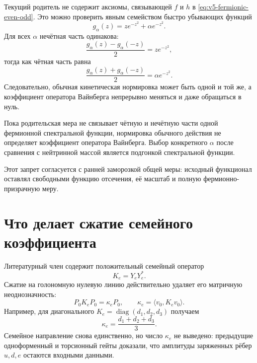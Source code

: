 Текущий родитель не содержит аксиомы, связывающей $f$ и $h$ в
\eqref{eq:v5-fermionic-even-odd}. Это можно проверить явным семейством
быстро убывающих функций
\begin{equation}
 g_\alpha(z)=z e^{-z^2}+\alpha e^{-z^2}.
 \label{eq:v5-fermionic-function-counterfamily}
\end{equation}
Для всех $\alpha$ нечётная часть одинакова:
\begin{equation}
 \frac{g_\alpha(z)-g_\alpha(-z)}2=z e^{-z^2},
\end{equation}
тогда как чётная часть равна
\begin{equation}
 \frac{g_\alpha(z)+g_\alpha(-z)}2=\alpha e^{-z^2}.
\end{equation}
Следовательно, обычная кинетическая нормировка может быть одной и той же,
а коэффициент оператора Вайнберга непрерывно меняться и даже обращаться в
нуль.

\begin{nogocriterion}
Пока родительская мера не связывает чётную и нечётную части одной
фермионной спектральной функции, нормировка обычного действия не определяет
коэффициент оператора Вайнберга. Выбор конкретного $\alpha$ после сравнения
с нейтринной массой является подгонкой спектральной функции.
\end{nogocriterion}

Этот запрет согласуется с ранней заморозкой общей меры: исходный
функционал оставлял свободными функцию отсечения, её масштаб и полную
фермионно-призрачную меру.

\section{Что делает сжатие семейного коэффициента}

Литературный член содержит положительный семейный оператор
\begin{equation}
 K_e=Y_eY_e^*.
\end{equation}
Сжатие на голономную нулевую линию действительно удаляет его матричную
неоднозначность:
\begin{equation}
 P_0K_eP_0=\kappa_eP_0,
 \qquad
 \kappa_e=\langle v_0,K_ev_0\rangle.
 \label{eq:v5-charged-lepton-compression}
\end{equation}
Например, для диагонального
$K_e=\operatorname{diag}(d_1,d_2,d_3)$ получаем
\begin{equation}
 \kappa_e=\frac{d_1+d_2+d_3}{3}.
\end{equation}
Семейное направление снова единственно, но число $\kappa_e$ не выведено:
предыдущие одноформенный и торсионный гейты доказали, что амплитуды
заряженных рёбер $u,d,e$ остаются входными данными.

